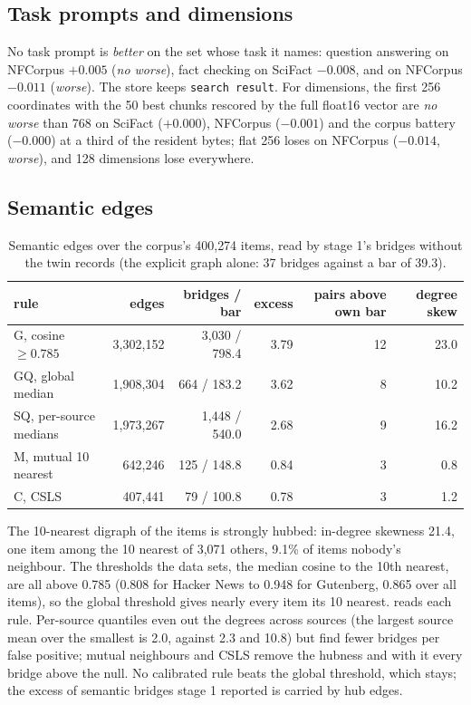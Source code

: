 \documentclass[11pt]{article}
\theoremstyle{plain}
\theoremstyle{definition}
\theoremstyle{remark}
\newcommand{\code}[1]{\texttt{#1}}
\begin{document}
\subsection{Task prompts and dimensions}

No task prompt is \emph{better} on the set whose task it names: question answering on NFCorpus
$+0.005$ (\emph{no worse}), fact checking on SciFact $-0.008$, and on NFCorpus $-0.011$
(\emph{worse}). The store keeps \code{search result}. For dimensions, the first 256 coordinates with
the 50 best chunks rescored by the full float16 vector are \emph{no worse} than 768 on SciFact
($+0.000$), NFCorpus ($-0.001$) and the corpus battery ($-0.000$) at a third of the resident
bytes; flat 256 loses on NFCorpus ($-0.014$, \emph{worse}), and 128 dimensions lose everywhere.

\subsection{Semantic edges}

\begin{table}[t]
\centering\small
\caption{Semantic edges over the corpus's 400{,}274 items, read by stage 1's bridges without the
twin records (the explicit graph alone: 37 bridges against a bar of 39.3).}\label{tab:edges}
\setlength{\tabcolsep}{3.5pt}
\begin{tabular}{lrrrrr}
\toprule
rule & edges & bridges / bar & excess & pairs above own bar & degree skew \\
\midrule
G, cosine $\ge 0.785$ & 3{,}302{,}152 & 3{,}030 / 798.4 & 3.79 & 12 & 23.0 \\
GQ, global median & 1{,}908{,}304 & 664 / 183.2 & 3.62 & 8 & 10.2 \\
SQ, per-source medians & 1{,}973{,}267 & 1{,}448 / 540.0 & 2.68 & 9 & 16.2 \\
M, mutual 10 nearest & 642{,}246 & 125 / 148.8 & 0.84 & 3 & 0.8 \\
C, CSLS & 407{,}441 & 79 / 100.8 & 0.78 & 3 & 1.2 \\
\bottomrule
\end{tabular}
\end{table}

The 10-nearest digraph of the items is strongly hubbed: in-degree skewness 21.4, one item among
the 10 nearest of 3{,}071 others, 9.1\% of items nobody's neighbour. The thresholds the data sets,
the median cosine to the 10th nearest, are all above 0.785 (0.808 for Hacker News to 0.948 for
Gutenberg, 0.865 over all items), so the global threshold gives nearly every item its 10 nearest.
 reads each rule. Per-source quantiles even out the degrees across sources (the
largest source mean over the smallest is 2.0, against 2.3 and 10.8) but find fewer bridges per
false positive; mutual neighbours and CSLS remove the hubness and with it every bridge above the
null. No calibrated rule beats the global threshold, which stays; the excess of semantic bridges
stage 1 reported is carried by hub edges.
\end{document}
